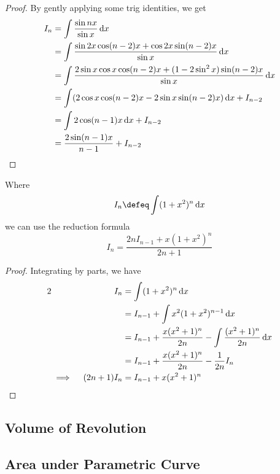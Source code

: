 \begin{proof}
 By gently applying some trig identities, we get
 \begin{align*}
  I_n &= \integ{\frac{\sin nx}{\sin x}}{x} \\
      &= \integ{\frac{\sin 2x \cos (n - 2)x +
                      \cos 2x \sin (n - 2) x}{\sin x}}{x} \\
      &= \integ{\frac{2\sin x \cos x \cos (n - 2)x +
                      (1 - 2 \sin^2 x) \sin (n - 2) x}{\sin x}}{x} \\
      &= \integ{(2\cos x \cos (n - 2)x - 2\sin x \sin (n - 2) x)}{x}
         + I_{n - 2} \\
      &= \integ{2 \cos (n - 1) x}{x} + I_{n - 2} \\
      &= \frac{2 \sin (n - 1) x}{n - 1} + I_{n - 2} \qedhere
 \end{align*}
\end{proof}
\begin{theorem}
 Where
 \begin{equation*}
  I_n \defeq \integ{(1 + x^2)^n}{x}
 \end{equation*}
 we can use the reduction formula
 \begin{equation*}
  I_n = \frac{2n I_{n - 1} + x(1 + x^2)^n}{2n + 1}
 \end{equation*}
\end{theorem}
\begin{proof}
 Integrating by parts, we have
 \begin{alignat*}2
  && I_n &= \integ{(1 + x^2)^n}{x} \\
  &&     &= I_{n - 1} + \integ{x^2 (1 + x^2)^{n - 1}}{x} \\
  &&     &= I_{n - 1} + \frac{x(x^2 + 1)^n}{2n} -
                        \integ{\frac{(x^2 + 1)^n}{2n}}{x} \\
  &&     &= I_{n - 1} + \frac{x(x^2 + 1)^n}{2n} - \frac 1{2n} I_n \\
  &\implies{}& (2n + 1) I_n
         &= I_{n - 1} + x(x^2 + 1)^n \qedhere
 \end{alignat*}
\end{proof}

\subsection{Volume of Revolution}

\subsection{Area under Parametric Curve} \label{sec_calc_parametric_area}

